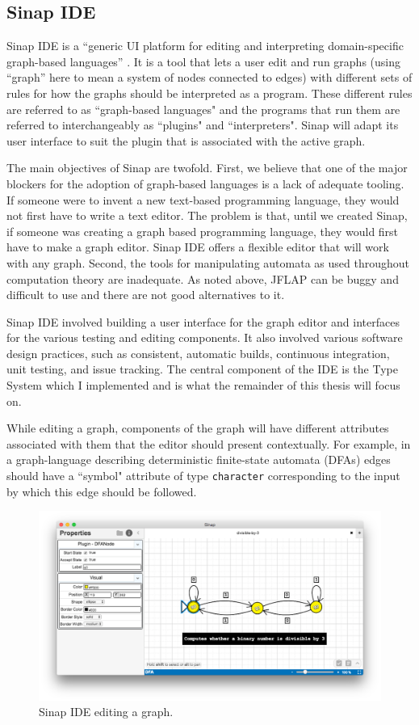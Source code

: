 \documentclass[12pt]{article}
\begin{document}
\subsection{Sinap IDE}

Sinap IDE is a ``generic UI platform 
for editing and interpreting domain-specific graph-based languages''
\cite{sinap-ide}. It is a tool that lets a user edit and run graphs
(using ``graph'' here to mean a system of nodes connected to edges) with
different sets of rules for how the graphs should be interpreted as a
program. These different rules are referred to as ``graph-based languages"
and the programs that run them are referred to interchangeably as 
``plugins" and ``interpreters". Sinap will adapt its user interface to 
suit the plugin that is associated with the active graph. 

The main objectives of Sinap are twofold. First, we believe that one
of the major blockers for the adoption of graph-based languages is 
a lack of adequate tooling. If someone were to invent a new text-based programming
language, they would not first have to write a text editor. The problem is
that, until we created Sinap, if someone was creating a graph based programming
language, they would first have to make a graph editor. Sinap IDE 
offers a flexible editor that will work with any graph. Second, 
the tools for manipulating automata as used throughout computation 
theory are inadequate. As noted above, JFLAP can be buggy and 
difficult to use and there are not good alternatives to it. 

Sinap IDE involved building a user interface for the graph editor and
interfaces for the various testing and editing components. 
It also involved various software design practices, such as
consistent, automatic builds, continuous integration, 
unit testing, and issue tracking. The central component of the IDE is 
the Type System which I implemented and is what the remainder of this
thesis will focus on.

While editing a graph, components of the
graph will have different attributes associated with them 
that the editor should present contextually. For example, in
a graph-language describing deterministic finite-state 
automata (DFAs) edges should have a ``symbol" attribute of 
type \texttt{character} corresponding to the input by which this 
edge should be followed. 

\begin{figure}
    \centering
    \includegraphics[width=.8\textwidth]{sinap-screenshot}
    \caption{Sinap IDE editing a graph.}
    \label{sinap-screenshot}  
\end{figure}
\end{document}
